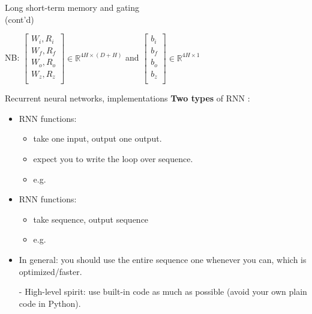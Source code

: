 \begin{frame}{Long short-term memory and gating\\ (cont'd)}
\begin{itemize}
\end{itemize}
\vsp
NB: $      \begin{bmatrix}
           W_{i}, R_{i} \\
           W_{f}, R_{f} \\
           W_{o}, R_{o} \\
           W_{z}, R_{z} \\
         \end{bmatrix} \in \mathbb{R}^{4H \times (D+H)}$ and  
$\begin{bmatrix}
           b_i \\
           b_f \\
           b_o \\
           b_z \\
         \end{bmatrix} \in \mathbb{R}^{4H \times 1}$
\end{frame}



\begin{frame}{Recurrent neural networks, implementations}
\textbf{Two types} of RNN :
\begin{itemize}
\item {} RNN functions:
\begin{itemize}
\item take one input, output one output.
\item expect you to write the loop over sequence. 
\item e.g. 
\end{itemize}
\item {} RNN functions:
\begin{itemize}
\item take sequence, output sequence
\item e.g. 
\end{itemize}
\item In general: you should use the entire sequence one whenever you can,
which is optimized/faster.\\
\item[-] High-level spirit: use built-in code as much as possible (avoid your own plain code in Python).\\
\end{itemize}
\end{frame}

